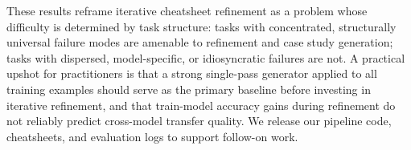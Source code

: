 These results reframe iterative cheatsheet refinement as a problem whose difficulty is
determined by task structure: tasks with concentrated, structurally universal failure modes
are amenable to refinement and case study generation; tasks with dispersed, model-specific,
or idiosyncratic failures are not.
A practical upshot for practitioners is that a strong single-pass generator applied to all
training examples should serve as the primary baseline before investing in iterative
refinement, and that train-model accuracy gains during refinement do not reliably predict
cross-model transfer quality.
We release our pipeline code, cheatsheets, and evaluation logs to support follow-on work.
